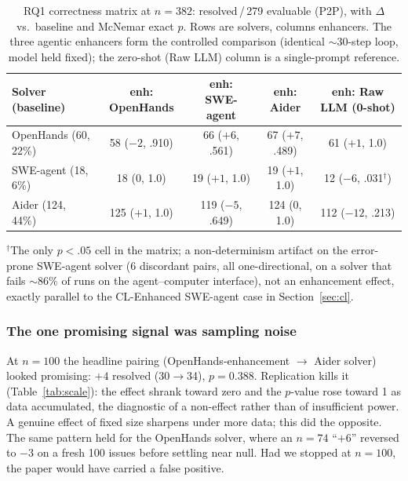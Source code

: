 \documentclass[journal]{IEEEtran}
\newcommand{\ourmethod}{CL-Enhanced}
\begin{document}
\begin{table}[t]
\centering
\caption{RQ1 correctness matrix at $n=382$: resolved\,/\,279 evaluable (P2P), with $\Delta$ vs.\ baseline and McNemar exact $p$. Rows are solvers, columns enhancers. The three agentic enhancers form the controlled comparison (identical $\sim$30-step loop, model held fixed); the zero-shot (Raw LLM) column is a single-prompt reference.}
\label{tab:matrix}
\setlength{\tabcolsep}{6pt}
\begin{tabular}{@{}lcccc@{}}
\toprule
Solver (baseline) & enh: OpenHands & enh: SWE-agent & enh: Aider & enh: Raw LLM (0-shot) \\
\midrule
OpenHands (60, 22\%) & 58 ($-2$, .910) & 66 ($+6$, .561)  & 67 ($+7$, .489) & 61 ($+1$, 1.0) \\
SWE-agent (18, 6\%)  & 18 ($0$, 1.0)   & 19 ($+1$, 1.0)   & 19 ($+1$, 1.0)  & 12 ($-6$, .031$^{\dagger}$) \\
Aider (124, 44\%)    & 125 ($+1$, 1.0) & 119 ($-5$, .649) & 124 ($0$, 1.0)  & 112 ($-12$, .213) \\
\bottomrule
\end{tabular}

\vspace{2pt}
{\footnotesize $^{\dagger}$The only $p<.05$ cell in the matrix; a non-determinism artifact on the error-prone SWE-agent solver (6 discordant pairs, all one-directional, on a solver that fails $\sim$86\% of runs on the agent--computer interface), not an enhancement effect, exactly parallel to the \ourmethod{} SWE-agent case in Section~\ref{sec:cl}.}
\end{table}

\subsubsection{The one promising signal was sampling noise}
At $n=100$ the headline pairing (OpenHands-enhancement $\rightarrow$ Aider solver) looked promising: $+4$ resolved (30$\rightarrow$34), $p=0.388$. Replication kills it (Table~\ref{tab:scale}): the effect shrank toward zero and the $p$-value rose toward 1 as data accumulated, the diagnostic of a non-effect rather than of insufficient power. A genuine effect of fixed size sharpens under more data; this did the opposite. The same pattern held for the OpenHands solver, where an $n=74$ ``$+6$'' reversed to $-3$ on a fresh 100 issues before settling near null. Had we stopped at $n=100$, the paper would have carried a false positive.
\end{document}

